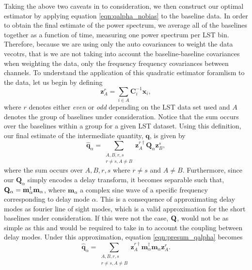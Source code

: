 \documentclass[twocolumn,numberedappendix]{emulateapj} \shorttitle{PSA64}
\newcommand{\qhat}{\hat{\mathbf{q}}}
\begin{document}
Taking the above two caveats in to consideration, we then construct our optimal
estimator by applying equation \ref{eqn:qalpha_nobias} to the baseline data. In
order to obtain the final estimate of the power spectrum, we average all of the
baselines together as a function of time, measuring one power spectrum per LST
bin. Therefore, because we are using only the auto covariances to weight the
data vecotrs, that is we are not taking into account the baseline-baseline
covariances when weighting the data, only the frequency frequency covariances
between channels. To understand the application of this quadratic estimator
foramlism to the data, let us begin by defining 
\begin{equation}\label{eqn:presum_oqe}
    \mathbf{z}^{r}_{A} = \sum_{i\in{A}} \mathbf{C}_{i}^{-1}\mathbf{x}_{i},
\end{equation}
where $r$ denotes either \emph{even} or \emph{odd} depending on the LST data set
used and $A$ denotes the group of baselines under consideration. Notice that the
sum occurs over the baselines within a group for a given LST dataset. Using this
definition, our final estimate of the intermediate quantity, $\mathbf{q}$, is
given by 
\begin{equation}\label{eqn:presum_qalpha}
    \qhat_{\alpha} = \sum_{\substack{A,B,r,s\\r\ne{s},A\ne{B}}}\mathbf{z}^{r\dagger}_{A}\mathbf{Q}_{\alpha}\mathbf{z}^{s}_{B},
\end{equation}
where the sum occurs over $A,B,r,s$ where $r\ne{s}$ and $A\ne{B}$. Furthermore,
since our $\mathbf{Q}_{\alpha}$ simply encodes a delay transform, it becomes
separable such that, $\mathbf{Q}_{\alpha} =
\mathbf{m}_{\alpha}^{\dagger}\mathbf{m}_{\alpha}$, where $\mathbf{m}_{\alpha}$ a
complex sine wave of a specific frequency corresponding to delay mode $\alpha$.
This is a consequence of approximating delay modes as fourier line of sight
modes, which is a valid approximation for the short baselines under
consideration. If this were not the case, $\mathbf{Q}$, would not be as simple as this
and would be required to take in to account the coupling between delay modes. 
Under this approximation, equation \ref{eqn:presum_qalpha} becomes
\begin{equation}
    \qhat_{\alpha} =
\sum_{\substack{A,B,r,s\\r\ne{s},A\ne{B}}}\mathbf{z}^{r\dagger}_{A}\mathbf{m}_{\alpha}^{\dagger}\mathbf{m}_{\alpha}\mathbf{z}^{r}_{A}.
\end{equation}
\end{document}
